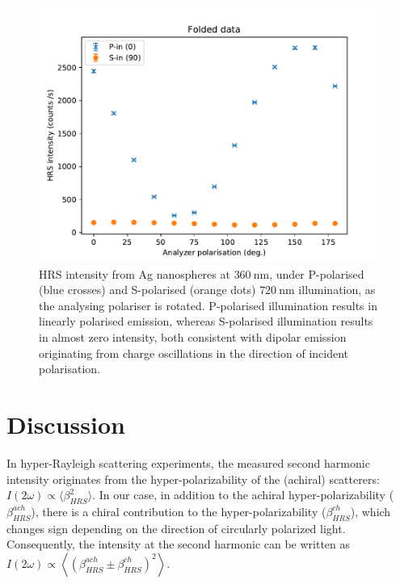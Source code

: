\begin{figure}[htb!]	
    \centering	
    \includegraphics[scale=0.7]{./figures/results/HRS/hrs_spheres.pdf}
    \caption{\label{fig:results:HRS:hrs_spheres}
    HRS intensity from Ag nanospheres at $\SI{360}{\nano\m}$, under P-polarised (blue crosses) and S-polarised (orange dots) $\SI{720}{\nano\m}$ illumination, as the analysing polariser is rotated. P-polarised illumination results in linearly polarised emission, whereas S-polarised illumination results in almost zero intensity, both consistent with dipolar emission originating from charge oscillations in the direction of incident polarisation.}	
\end{figure}

\section{Discussion}

In hyper-Rayleigh scattering experiments, the measured second harmonic intensity originates from the hyper-polarizability of the (achiral) scatterers: $I(2\omega) \propto \langle \beta^{2}_{HRS} \rangle$.
In our case, in addition to the achiral hyper-polarizability ($\beta^{ach}_{HRS}$), there is a chiral contribution to the hyper-polarizability ($\beta^{ch}_{HRS}$), which changes sign depending on the direction of circularly polarized light. Consequently, the intensity at the second harmonic can be written as $I\left( {2\omega } \right) \propto \left\langle {{{\left( {\beta _{HRS}^{ach} \pm \beta _{HRS}^{ch}} \right)}^2}} \right\rangle$.

